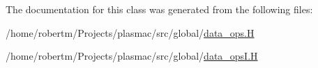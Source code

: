 The documentation for this class was generated from the following files\+:\begin{DoxyCompactItemize}
\item 
/home/robertm/\+Projects/plasmac/src/global/\hyperlink{data__ops_8H}{data\+\_\+ops.\+H}\item 
/home/robertm/\+Projects/plasmac/src/global/\hyperlink{data__opsI_8H}{data\+\_\+ops\+I.\+H}\end{DoxyCompactItemize}

